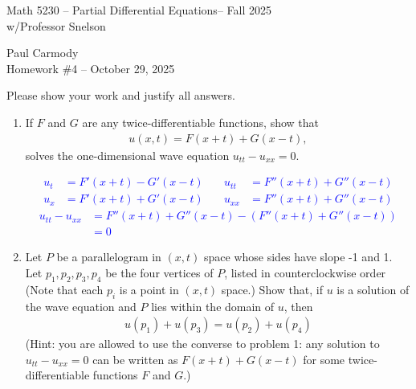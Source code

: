 \documentclass[10pt,a4paper]{report}
\newcommand{\CLASSNAME}{Math 5230 -- Partial Differential Equations}
\newcommand{\STUDENTNAME}{Paul Carmody}
\newcommand{\ASSIGNMENT}{Homework \#4 }
\newcommand{\DUEDATE}{October 29, 2025}
\newcommand{\SEMESTER}{Fall 2025}
\newcommand{\BLUE}[1]{\textcolor{blue}{#1}}
\begin{document}
\begin{center}
	\Large{\CLASSNAME -- \SEMESTER} \\
	\large{ w/Professor Snelson}
\end{center}
\begin{center}
	\STUDENTNAME \\
	\ASSIGNMENT -- \DUEDATE\\
\end{center} 

\noindent Please show your work and justify all answers.

\begin{enumerate}

\item If $F$ and $G$ are any twice-differentiable functions, show that 
\begin{align*}
	u(x,t) = F(x+t)+G(x-t),
\end{align*}solves the one-dimensional wave equation $u_{tt}-u_{xx}=0$.

\BLUE{\begin{align*}
	u_t &= F'(x+t) -G'(x-t) & \quad u_{tt} &= F''(x+t) + G''(x-t)\\
	u_x &= F'(x+t) + G'(x-t) & \quad u_{xx} &= F''(x+t) + G''(x-t)
\end{align*}\begin{align*}
	u_{tt}-u_{xx} &= F''(x+t) + G''(x-t) - (F''(x+t) + G''(x-t)) \\
	&=0
\end{align*}
}

\item Let $P$ be a parallelogram in $(x,t)$ space whose sides have slope -1 and 1.  Let $p_1,p_2,p_3,p_4$ be the four vertices of $P$, listed in counterclockwise order (Note that each $p_i$ is a point in $(x,t)$ space.)  Show that, if $u$ is a solution of the wave equation and $P$ lies within the domain of $u$, then 
\begin{align*}
	u(p_1)+u(p_3)=u(p_2)+u(p_4)
\end{align*}(Hint: you are allowed to use the converse to problem 1: any solution to $u_{tt}-u_{xx}=0$ can be written as $F(x+t)+G(x-t)$ for some twice-differentiable functions $F$ and $G$.)


\end{enumerate}
\end{document}
